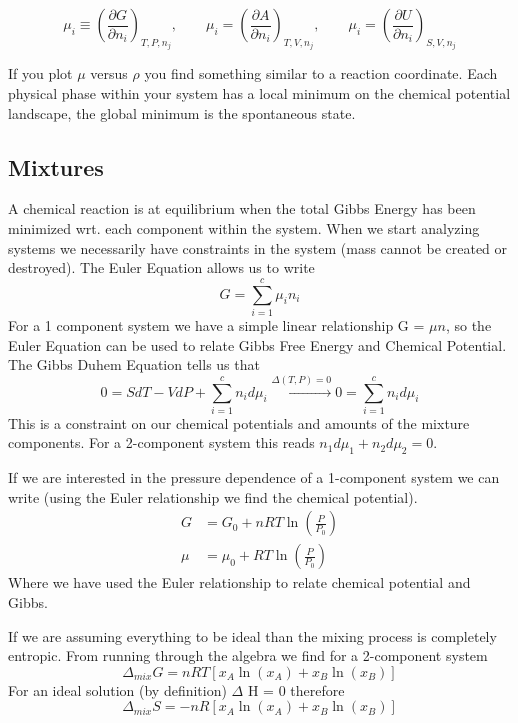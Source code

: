 \documentclass{article}
\begin{document}
\begin{equation}
    \mu_i \equiv \left(\frac{\partial G}{\partial n_i}\right)_{T,P,n_j}, \qquad \mu_i = \left(\frac{\partial A}{\partial n_i}\right)_{T,V,n_j}, \qquad  \mu_i = \left(\frac{\partial U}{\partial n_i}\right)_{S,V,n_j}
\end{equation}

If you plot $\mu$ versus $\rho$ you find something similar to a reaction coordinate. 
Each physical phase within your system has a local minimum on the chemical potential landscape, the global minimum is the spontaneous state. 

\subsection{Mixtures}
A chemical reaction is at equilibrium when the total Gibbs Energy has been minimized wrt. each component within the system. 
When we start analyzing systems we necessarily have constraints in the system (mass cannot be created or destroyed). 
The Euler Equation allows us to write 
\begin{equation}
    G = \sum_{i=1}^c \mu_in_i
\end{equation}
For a 1 component system we have a simple linear relationship G = $\mu n$, so the Euler Equation can be used to relate Gibbs Free Energy and Chemical Potential. 
The Gibbs Duhem Equation tells us that 
\begin{equation}
    0 = SdT -VdP + \sum_{i=1}^cn_id\mu_i \xrightarrow{\Delta (T,P) = 0} 0 = \sum_{i=1}^cn_id\mu_i
\end{equation}
This is a constraint on our chemical potentials and amounts of the mixture components. 
For a 2-component system this reads $n_1d\mu_1 + n_2d\mu_2 = 0$. 

If we are interested in the pressure dependence of a 1-component system we can write (using the Euler relationship we find the chemical potential). 
\begin{equation}
    \begin{split}
        G &= G_0 + nRT\ln\left(\frac{P}{P_0}\right) \\
        \mu &= \mu_0 + RT\ln\left(\frac{P}{P_0}\right)
    \end{split}
\end{equation}
 Where we have used the Euler relationship to relate chemical potential and Gibbs. 

 If we are assuming everything to be ideal than the mixing process is completely entropic. 
 From running through the algebra we find for a 2-component system 
 \begin{equation}
     \Delta_{mix} G = nRT\left[x_A\ln(x_A) + x_B\ln(x_B)\right]
 \end{equation}
For an ideal solution (by definition) $\Delta$ H = 0 therefore 
\begin{equation}
    \Delta_{mix}S = -nR\left[x_A\ln(x_A) + x_B\ln(x_B)\right]
\end{equation}
\end{document}
